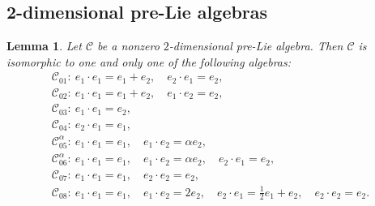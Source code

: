 \documentclass[pdftex]{sigma}
\numberwithin{equation}{section}
\newtheorem{Lemma}[Theorem]{Lemma}
\begin{document}
\subsection{2-dimensional pre-Lie algebras}

\begin{Lemma}
 Let $\mathcal{C}$ be a nonzero $2$-dimensional pre-Lie algebra.
Then $\mathcal{C}$ is isomorphic to one and only one of the following
algebras:
\begin{gather*}
 \mathcal{C}_{01} \colon\ e_{1} \cdot e_{1} = e_{1} + e_{2},\quad e_{2} \cdot e_{1} =e_{2},\\
 \mathcal{C}_{02} \colon\ e_{1}\cdot e_{1} = e_{1} + e_{2},\quad e_{1}\cdot e_{2} =e_{2}, \\
 \mathcal{C}_{03} \colon\ e_{1}\cdot e_{1} =e_{2}, \\
 \mathcal{C}_{04} \colon\ e_{2} \cdot e_{1} =e_{1}, \\
 \mathcal{C}_{05}^{\alpha} \colon\ e_{1}\cdot e_{1} =e_{1}, \quad e_{1}\cdot e_{2} = \alpha e_{2}, \\
 \mathcal{C}_{06}^{\alpha} \colon\ e_{1} \cdot e_{1} =e_{1}, \quad e_{1} \cdot e_{2} = \alpha e_{2},\quad e_{2} \cdot e_{1} =e_{2}, \\
 \mathcal{C}_{07} \colon\ e_{1}\cdot e_{1} =e_{1}, \quad e_{2}\cdot e_{2}=e_{2}, \\
 \mathcal{C}_{08} \colon\ e_{1}\cdot e_{1} =e_{1}, \quad e_{1}\cdot e_{2} = 2 e_{2}, \quad e_{2}\cdot e_{1} =\tfrac{1}{2} e_{1} + e_2, \quad e_{2}\cdot e_{2}=e_{2}.
\end{gather*}
\end{Lemma}
\end{document}
